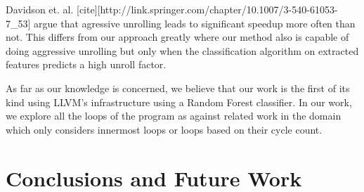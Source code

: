 \documentclass[]{sig-alternate}
\begin{document}
Davidson et. al. [cite][http://link.springer.com/chapter/10.1007/3-540-61053-7_53] argue that agressive unrolling leads to significant speedup more often than not. This differs from our approach greatly where our method also is capable of doing aggressive unrolling but only when the classification algorithm on extracted features predicts a high unroll factor.

As far as our knowledge is concerned, we believe that our work is the first of its kind using LLVM's infrastructure using a Random Forest classifier. In our work, we  explore all the loops of the program as against related work in the domain which only considers innermost loops or loops based on their cycle count.

\section{Conclusions and Future Work}
\label{sec:FutureWork}

%

\begin{scriptsize}
  
\end{scriptsize}
\end{document}
